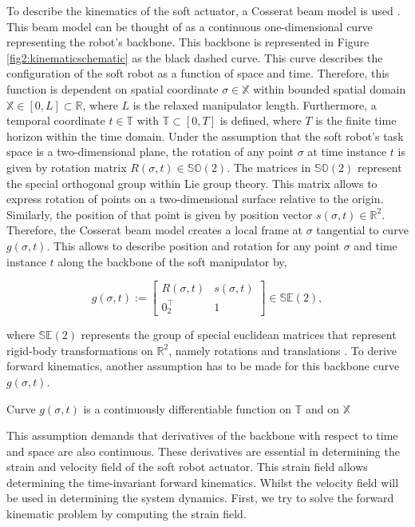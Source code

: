To describe the kinematics of the soft actuator, a Cosserat beam model is used \cite{Boyer2019}. This beam model can be thought of as a continuous one-dimensional curve representing the robot's backbone. This backbone is represented in Figure \ref{fig2:kinematicschematic} as the black dashed curve. This curve describes the configuration of the soft robot as a function of space and time. Therefore, this function is dependent on spatial coordinate $\sigma \in \mathbb{X}$ within bounded spatial domain $\mathbb{X} \in [0,L] \subset \mathbb{R}$, where $L$ is the relaxed manipulator length. Furthermore, a temporal coordinate $t \in \mathbb{T}$ with $\mathbb{T} \subset [0,T]$ is defined, where $T$ is the finite time horizon within the time domain. Under the assumption that the soft robot's task space is a two-dimensional plane, the rotation of any point $\sigma$ at time instance $t$ is given by rotation matrix $R(\sigma,t) \in \mathbb{SO}(2)$. The matrices in $\mathbb{SO}(2)$ represent the special orthogonal group within Lie group theory. This matrix allows to express rotation of points on a two-dimensional surface relative to the origin. Similarly, the position of that point is given by position vector $s(\sigma,t) \in \mathbb{R}^2$. Therefore, the Cosserat beam model creates a local frame at $\sigma$ tangential to curve $g(\sigma,t)$. This allows to describe position and rotation for any point $\sigma$ and time instance $t$ along the backbone of the soft manipulator by,


\begin{equation}
    g(\sigma,t) := \begin{bmatrix}  R(\sigma,t) & s(\sigma,t) \\ 0_2^\top & 1 \end{bmatrix} \in \mathbb{SE}(2),
    \label{eq2:g}
\end{equation}

where $\mathbb{SE}(2)$ represents the group of special euclidean matrices that represent rigid-body transformations on $\mathbb{R}^2$, namely rotations and translations \cite{Sola2018}. To derive forward kinematics, another assumption has to be made for this backbone curve $g(\sigma,t)$.

\begin{theorem}
Curve  $g(\sigma,t)$ is a continuously differentiable function on $\mathbb{T}$ and on $\mathbb{X}$
\end{theorem}

This assumption demands that derivatives of the backbone with respect to time and space are also continuous. These derivatives are essential in determining the strain and velocity field of the soft robot actuator. This strain field allows determining the time-invariant forward kinematics. Whilst the velocity field will be used in determining the system dynamics. First, we try to solve the forward kinematic problem by computing the strain field.




